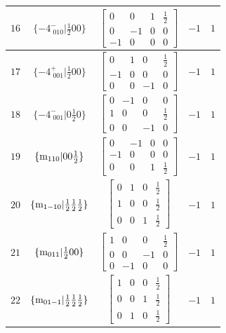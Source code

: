 \documentclass[fleqn,8pt]{jsarticle}
\begin{document}
\begin{longtable}{ccccc}
$ 16 $ & $ \{-4^{-}_{\,\,010}|\frac{1}{2} 0 0\} $ & $ \begin{bmatrix} 0 & 0 & 1 & \frac{1}{2} \\ 0 & -1 & 0 & 0 \\ -1 & 0 & 0 & 0 \end{bmatrix} $ & $ -1 $ & $ 1 $ \\ \hline
$ 17 $ & $ \{-4^{+}_{\,\,001}|\frac{1}{2} 0 0\} $ & $ \begin{bmatrix} 0 & 1 & 0 & \frac{1}{2} \\ -1 & 0 & 0 & 0 \\ 0 & 0 & -1 & 0 \end{bmatrix} $ & $ -1 $ & $ 1 $ \\ \hline
$ 18 $ & $ \{-4^{-}_{\,\,001}|0 \frac{1}{2} 0\} $ & $ \begin{bmatrix} 0 & -1 & 0 & 0 \\ 1 & 0 & 0 & \frac{1}{2} \\ 0 & 0 & -1 & 0 \end{bmatrix} $ & $ -1 $ & $ 1 $ \\ \hline
$ 19 $ & $ \{{\rm m}_{110}|0 0 \frac{1}{2}\} $ & $ \begin{bmatrix} 0 & -1 & 0 & 0 \\ -1 & 0 & 0 & 0 \\ 0 & 0 & 1 & \frac{1}{2} \end{bmatrix} $ & $ -1 $ & $ 1 $ \\ \hline
$ 20 $ & $ \{{\rm m}_{1-10}|\frac{1}{2} \frac{1}{2} \frac{1}{2}\} $ & $ \begin{bmatrix} 0 & 1 & 0 & \frac{1}{2} \\ 1 & 0 & 0 & \frac{1}{2} \\ 0 & 0 & 1 & \frac{1}{2} \end{bmatrix} $ & $ -1 $ & $ 1 $ \\ \hline
$ 21 $ & $ \{{\rm m}_{011}|\frac{1}{2} 0 0\} $ & $ \begin{bmatrix} 1 & 0 & 0 & \frac{1}{2} \\ 0 & 0 & -1 & 0 \\ 0 & -1 & 0 & 0 \end{bmatrix} $ & $ -1 $ & $ 1 $ \\ \hline
$ 22 $ & $ \{{\rm m}_{01-1}|\frac{1}{2} \frac{1}{2} \frac{1}{2}\} $ & $ \begin{bmatrix} 1 & 0 & 0 & \frac{1}{2} \\ 0 & 0 & 1 & \frac{1}{2} \\ 0 & 1 & 0 & \frac{1}{2} \end{bmatrix} $ & $ -1 $ & $ 1 $ \\ \hline

\end{longtable}
\end{document}
